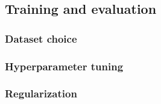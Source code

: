 \subsection{Training and evaluation}
	\subsubsection{Dataset choice}
	\subsubsection{Hyperparameter tuning}
	\subsubsection{Regularization}
